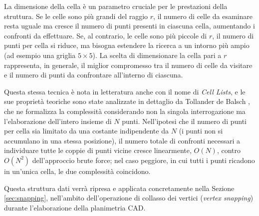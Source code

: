 La dimensione della cella è un parametro cruciale per le prestazioni della struttura. Se le celle sono più grandi del raggio $r$, il numero di celle da esaminare resta uguale ma cresce il numero di punti presenti in ciascuna cella, aumentando i confronti da effettuare. Se, al contrario, le celle sono più piccole di $r$, il numero di punti per cella si riduce, ma bisogna estendere la ricerca a un intorno più ampio (ad esempio una griglia $5 \times 5$). La scelta di dimensionare la cella pari a $r$ rappresenta, in generale, il miglior compromesso tra il numero di celle da visitare e il numero di punti da confrontare all'interno di ciascuna.

Questa stessa tecnica è nota in letteratura anche con il nome di \emph{Cell Lists}, e le sue proprietà teoriche sono state analizzate in dettaglio da Tollander de Balsch \cite{tollander2020celllists}, che ne formalizza la complessità considerando non la singola interrogazione ma l'elaborazione dell'intero insieme di $N$ punti. Nell'ipotesi che il numero di punti per cella sia limitato da una costante indipendente da $N$ (i punti non si accumulano in una stessa posizione), il numero totale di confronti necessari a individuare tutte le coppie di punti vicine cresce linearmente, $O(N)$, contro $O(N^2)$ dell'approccio brute force; nel caso peggiore, in cui tutti i punti ricadono in un'unica cella, le due complessità coincidono.

Questa struttura dati verrà ripresa e applicata concretamente nella Sezione \ref{sec:snapping}, nell'ambito dell'operazione di collasso dei vertici (\emph{vertex snapping}) durante l'elaborazione della planimetria CAD.
